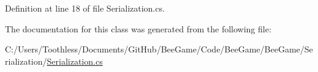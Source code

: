 Definition at line 18 of file Serialization.\+cs.



The documentation for this class was generated from the following file\+:\begin{DoxyCompactItemize}
\item 
C\+:/\+Users/\+Toothless/\+Documents/\+Git\+Hub/\+Bee\+Game/\+Code/\+Bee\+Game/\+Bee\+Game/\+Serialization/\hyperlink{_serialization_8cs}{Serialization.\+cs}\end{DoxyCompactItemize}
